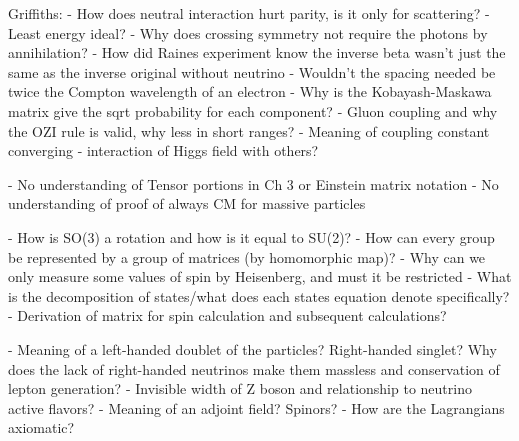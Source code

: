 \documentclass[11 pt, twoside]{article}
\begin{document}
Griffiths:
- How does neutral interaction hurt parity, is it only for scattering?
- Least energy ideal?
- Why does crossing symmetry not require the photons by annihilation?
- How did Raines experiment know the inverse beta wasn't just the same as the inverse original without neutrino
- Wouldn't the spacing needed be twice the Compton wavelength of an electron
- Why is the Kobayash-Maskawa matrix give the sqrt probability for each component?
- Gluon coupling and why the OZI rule is valid, why less in short ranges?
- Meaning of coupling constant converging - interaction of Higgs field with others?

- No understanding of Tensor portions in Ch 3 or Einstein matrix notation
- No understanding of proof of always CM for massive particles

- How is SO(3) a rotation and how is it equal to SU(2)?
- How can every group be represented by a group of matrices (by homomorphic map)?
- Why can we only measure some values of spin by Heisenberg, and must it be restricted
- What is the decomposition of states/what does each states equation denote specifically?
- Derivation of matrix for spin calculation and subsequent calculations?

- Meaning of a left-handed doublet of the particles? Right-handed singlet? Why does the lack of right-handed neutrinos make them massless and conservation of lepton generation?
- Invisible width of Z boson and relationship to neutrino active flavors?
- Meaning of an adjoint field? Spinors?
- How are the Lagrangians axiomatic?
\end{document}
